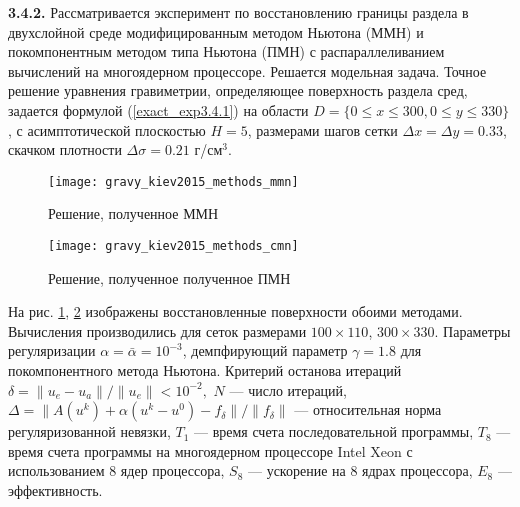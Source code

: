 \newpage
{\bfseries 3.4.2.} Рассматривается эксперимент по восстановлению границы раздела в двухслойной среде модифицированным методом Ньютона (ММН) и покомпонентным методом типа Ньютона (ПМН) с распараллеливанием вычислений на многоядерном процессоре. Решается модельная задача. Точное решение уравнения гравиметрии, определяющее поверхность раздела сред, задается формулой (\ref{exact_exp3.4.1}) на области $D=\{0\le x\le 300, 0\le y\le 330\}$, с асимптотической плоскостью $  H=5$, размерами шагов сетки $\Delta x=\Delta y=0.33$, скачком плотности $\Delta\sigma=0.21$ г/см$^3$.
\begin{figure}[H]
	\centering
	\texttt{[image: gravy\_kiev2015\_methods\_mmn]}
	\caption{Решение, полученное ММН}
	\label{fig:gravy_kiev2015_methods_mmn}
\end{figure}
\begin{figure}[h]
	\centering
	\texttt{[image: gravy\_kiev2015\_methods\_cmn]}
	\caption{Решение, полученное полученное ПМН}
	\label{fig:gravy_kiev2015_methods_cmn}
\end{figure}
На рис. \ref{fig:gravy_kiev2015_methods_mmn}, \ref{fig:gravy_kiev2015_methods_cmn} изображены восстановленные поверхности обоими методами. Вычисления производились для сеток размерами $100\times 110$, $300\times 330$. Параметры регуляризации $\alpha=\bar{\alpha}=10^{-3}$, демпфирующий параметр $\gamma=1.8$ для покомпонентного метода Ньютона. Критерий останова итераций $\delta=\|u_e-u_a\|/\|u_e\|<10^{-2},$ $N$ --- число итераций, 
$\Delta=\|A(u^k)+\alpha(u^k-u^0)-f_\delta\|/\|f_\delta\|$ --- относительная норма регуляризованной невязки, $T_1$ --- время счета последовательной программы, $T_8$ --- время счета программы на многоядерном процессоре Intel Xeon с использованием 8 ядер процессора, $S_8$ --- ускорение на 8 ядрах процессора, $E_8$ --- эффективность.
